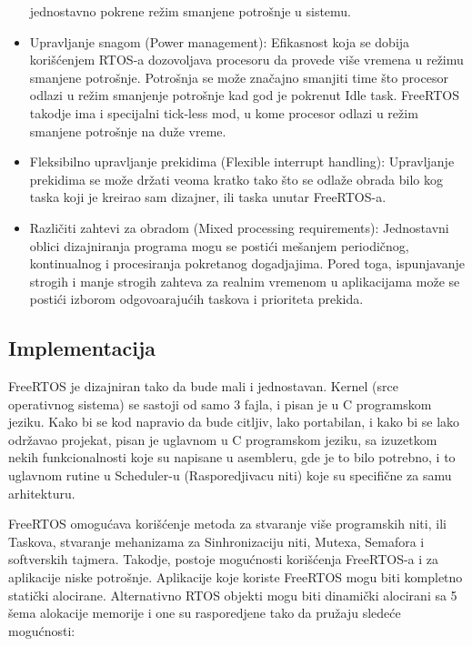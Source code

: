 \documentclass[a4paper,12pt, master]{etf}
\begin{document}
\begin{itemize}
		jednostavno pokrene re\v{z}im smanjene potro\v{s}nje u sistemu.
		\item Upravljanje snagom (Power management):
		Efikasnost koja se dobija kori\v{s}\'{c}enjem RTOS-a dozovoljava procesoru da provede vi\v{s}e
		vremena	u re\v{z}imu smanjene potro\v{s}nje. Potro\v{s}nja se mo\v{z}e zna\v{c}ajno smanjiti time
		\v{s}to procesor odlazi u re\v{z}im smanjenje potro\v{s}nje kad god je pokrenut Idle task. FreeRTOS
		takodje ima i specijalni tick-less mod, u kome procesor odlazi u re\v{z}im smanjene
		potro\v{s}nje na du\v{z}e vreme.
		\item Fleksibilno upravljanje prekidima (Flexible interrupt handling):
		Upravljanje prekidima se mo\v{z}e dr\v{z}ati veoma kratko tako \v{s}to se odla\v{z}e obrada bilo kog
		taska koji je kreirao sam dizajner, ili taska unutar FreeRTOS-a.
		\item Razli\v{c}iti zahtevi za obradom (Mixed processing requirements):
		Jednostavni oblici dizajniranja programa mogu se posti\'{c}i me\v{s}anjem periodi\v{c}nog,
		kontinualnog i procesiranja pokretanog dogadjajima. Pored toga, ispunjavanje strogih i
		manje strogih zahteva za realnim vremenom u aplikacijama mo\v{z}e se posti\'{c}i izborom
		odgovoaraju\'{c}ih taskova i prioriteta prekida.

	\end{itemize}

	\subsection{Implementacija}

	FreeRTOS je dizajniran tako da bude mali i jednostavan. Kernel (srce operativnog sistema)
	se sastoji od samo 3 fajla, i pisan je u C programskom jeziku. Kako bi se kod napravio da
	bude citljiv, lako portabilan, i kako bi se lako odr\v{z}avao projekat, pisan je uglavnom u C
	programskom jeziku, sa izuzetkom nekih funkcionalnosti koje su napisane u asembleru, gde je to
	bilo potrebno, i to uglavnom rutine u Scheduler-u (Rasporedjivacu niti) koje su specifi\v{c}ne
	za samu arhitekturu.

	FreeRTOS omogu\'{c}ava kori\v{s}\'{c}enje metoda za stvaranje vi\v{s}e programskih niti,
	ili Taskova, stvaranje mehanizama za Sinhronizaciju niti, Mutexa, Semafora i softverskih tajmera.
	Takodje, postoje mogu\'{c}nosti kori\v{s}\'{c}enja FreeRTOS-a i za aplikacije niske potro\v{s}nje.
	Aplikacije koje koriste FreeRTOS mogu biti kompletno stati\v{c}ki alocirane. Alternativno
	RTOS objekti mogu biti dinami\v{c}ki alocirani sa 5 \v{s}ema alokacije memorije i one su rasporedjene
	tako da pru\v{z}aju slede\'{c}e mogu\'{c}nosti:
\end{document}
